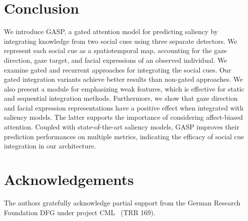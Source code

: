 \documentclass{article}
\begin{document}
\section{Conclusion}
\label{sec:conc}

We introduce GASP, a gated attention model for predicting saliency by integrating knowledge from two social cues using three separate detectors. We represent each social cue as a spatiotemporal map, accounting for the gaze direction, gaze target, and facial expressions of an observed individual. We examine gated and recurrent approaches for integrating the social cues. Our gated integration variants achieve better results than non-gated approaches. We also present a module for emphasizing weak features, which is effective for static and sequential integration methods. Furthermore, we show that gaze direction and facial expression representations have a positive effect when integrated with saliency models. The latter supports the importance of considering affect-biased attention. Coupled with state-of-the-art saliency models, GASP improves their prediction performances on multiple metrics, indicating the efficacy of social cue integration in our architecture. 













\section*{Acknowledgements}
The authors gratefully acknowledge partial support from the German
Research Foundation DFG under project CML ~(TRR 169).
















\end{document}
